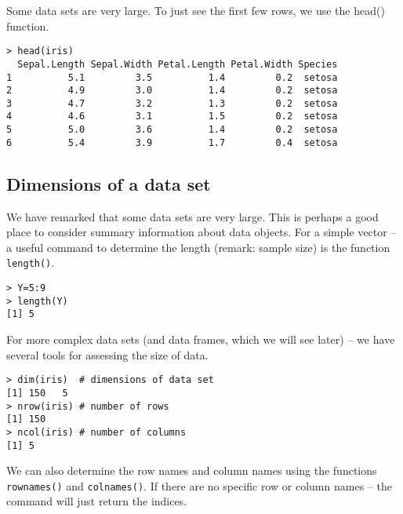 \documentclass{article}
\begin{document}
Some data sets are very large. To just see the first few rows, we use the head() function.

\begin{framed}
\begin{verbatim}
> head(iris)
  Sepal.Length Sepal.Width Petal.Length Petal.Width Species
1          5.1         3.5          1.4         0.2  setosa
2          4.9         3.0          1.4         0.2  setosa
3          4.7         3.2          1.3         0.2  setosa
4          4.6         3.1          1.5         0.2  setosa
5          5.0         3.6          1.4         0.2  setosa
6          5.4         3.9          1.7         0.4  setosa
\end{verbatim}
\end{framed}
\subsection*{Dimensions of a data set}
We have remarked that some data sets are very large. This is perhaps a good place to consider summary information about data objects.
For a simple vector – a useful command to determine the length (remark: sample size) is the function \texttt{length()}.
\begin{framed}
\begin{verbatim}
> Y=5:9
> length(Y)
[1] 5
\end{verbatim}
\end{framed}
For more complex data sets (and data frames, which we will see later) – we have several tools for assessing the size of data.
\begin{framed}
\begin{verbatim}
> dim(iris)  # dimensions of data set
[1] 150   5
> nrow(iris) # number of rows
[1] 150
> ncol(iris) # number of columns
[1] 5
\end{verbatim}
\end{framed}
We can also determine the row names and column names using the functions \texttt{rownames()} and \texttt{colnames()}.
If there are no specific row or column names – the command will just return the indices.
\end{document}
